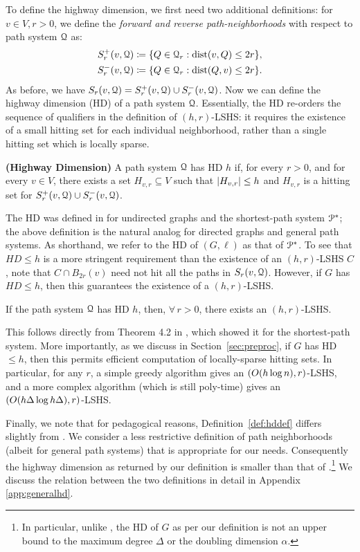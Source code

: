 To define the highway dimension, we first need two additional definitions:
for $v\in V, r>0$, we define the \emph{forward and reverse path-neighborhoods} with respect to path system $\mathcal{Q}$ as: 
\begin{align*}
S_r^+(v,\calQ) &\defeq\crl*{Q\in\calQ_r: \dist(v,Q)\leq 2r}, \\  
S_r^-(v,\calQ) &\defeq\crl*{Q\in\calQ_r: \dist(Q,v)\leq 2r}.
\end{align*}
As before, we have $S_r(v,\mathcal{Q}) = S_r^+(v,\mathcal{Q})\cup S_r^-(v,\mathcal{Q})$. Now we can define the highway dimension (HD) of a path system $\mathcal{Q}$. Essentially, the HD re-orders the sequence of qualifiers in the definition of $(h,r)$-LSHS: it requires the existence of a small hitting set for each individual neighborhood, rather than a single hitting set which is locally sparse. 
\begin{definition}
\label{def:hddef}
\textbf{(Highway Dimension)}
A path system $\mathcal{Q}$ has HD $h$ if, for every $r>0$, and for every $v\in V$, there exists a set $H_{v,r}\subseteq V$ such that $\lvert H_{v,r}\rvert\leq h$ and $H_{v,r}$ is a hitting set for $S_r^+(v,\mathcal{Q})\cup S_r^-(v,\mathcal{Q})$.
\end{definition}
The HD was defined in \cite{highway2013} for undirected graphs and the shortest-path system $\mathcal{P}^*$; the above definition is the natural analog for directed graphs and general path systems.
As shorthand, we refer to the HD of $(G,\ell)$ as that of $\mathcal{P}^*$. 
To see that $HD\leq h$ is a more stringent requirement than the existence of an $(h,r)$-LSHS $C$, note that $C\cap B_{2r}(v)$ need not hit all the paths in $S_r(v,\mathcal{Q})$. 
However, if $G$ has $HD\leq h$, then this guarantees the existence of a $(h,r)$-LSHS.
\begin{proposition}
If the path system $\mathcal{Q}$ has HD $h$, then, $\forall\,r>0$, there exists an $(h,r)$-LSHS.
\end{proposition}
This follows directly from Theorem 4.2 in \cite{highway2013}, which showed it for the shortest-path system. More importantly, as we discuss in Section~\ref{sec:preproc}, if $G$ has HD$\leq h$, then this permits efficient computation of locally-sparse hitting sets.
In particular, for any $r$, a simple greedy algorithm gives an $(O(h\log n),r)$-LSHS, and a more complex algorithm (which is still poly-time) gives an $(O(h\Delta\log h\Delta),r)$-LSHS.


Finally, we note that for pedagogical reasons, Definition~\ref{def:hddef} differs slightly from \cite{highway2013}.
We consider a less restrictive definition of path neighborhoods (albeit for general path systems) that is appropriate for our needs. Consequently the highway dimension as returned by our definition is smaller than that of \cite{highway2013}.\footnote{In particular, unlike \cite{highway2013}, the HD of $G$ as per our definition is not an upper bound to the maximum degree $\Delta$ or the doubling dimension $\alpha$.}
We discuss the relation between the two definitions in detail in Appendix \ref{app:generalhd}. 

